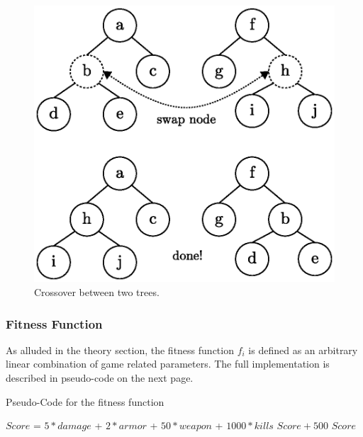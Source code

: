 \documentclass[a4paper, twocolumn]{article}
\begin{document}
        \begin{figure}[H]
            \centering
            \includegraphics[width=\linewidth]{share/node_swapping.eps}
            \caption{Crossover between two trees.}
            \label{fig:child_crossover}
        \end{figure}

        \subsubsection*{Fitness Function}
        As alluded in the theory section, the fitness function \(f_i\) is defined as an arbitrary linear combination of game related parameters. The full implementation is described in pseudo-code on the next page.
        \vspace{-0.4em}

        \begin{algorithm}[H]
            \caption{Pseudo-Code for the fitness function}
            \label{alg:fitness_function}
            \begin{algorithmic}
                $Score$ = $5 *damage$ + $2 * armor$ + $50 * weapon$ + $1000 * kills$
                    \RETURN $Score + 500$
                \ELSE
                    \RETURN $Score$
                \ENDIF
            \end{algorithmic}
        \end{algorithm}
        \vspace{-0.6em}
\end{document}
